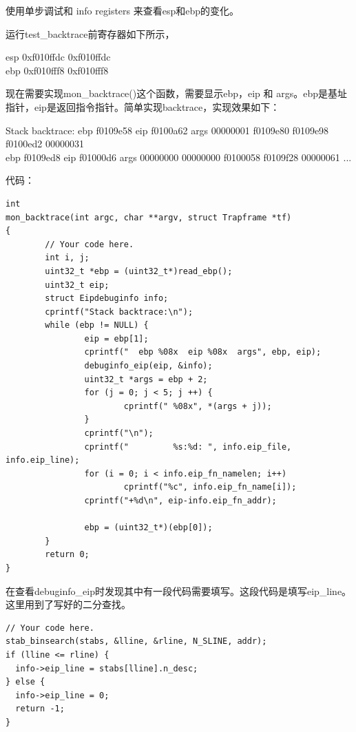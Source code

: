 \begin{ExerciseList}

使用单步调试和 info registers 来查看esp和ebp的变化。

运行test\_backtrace前寄存器如下所示，

{\noindent\small esp            0xf010ffdc    0xf010ffdc\\
ebp            0xf010fff8    0xf010fff8
}

现在需要实现mon\_backtrace()这个函数，需要显示ebp，eip 和 args。ebp是基址指针，eip是返回指令指针。简单实现backtrace，实现效果如下：

{\noindent\small Stack backtrace:
  ebp f0109e58  eip f0100a62  args 00000001 f0109e80 f0109e98 f0100ed2 00000031\\
  ebp f0109ed8  eip f01000d6  args 00000000 00000000 f0100058 f0109f28 00000061
  ...}

代码：

\begin{verbatim}
int
mon_backtrace(int argc, char **argv, struct Trapframe *tf)
{
        // Your code here.
        int i, j;
        uint32_t *ebp = (uint32_t*)read_ebp();
        uint32_t eip;
        struct Eipdebuginfo info;
        cprintf("Stack backtrace:\n");
        while (ebp != NULL) {
                eip = ebp[1];
                cprintf("  ebp %08x  eip %08x  args", ebp, eip);
                debuginfo_eip(eip, &info);
                uint32_t *args = ebp + 2;
                for (j = 0; j < 5; j ++) {
                        cprintf(" %08x", *(args + j));
                }
                cprintf("\n");
                cprintf("         %s:%d: ", info.eip_file, info.eip_line);
                for (i = 0; i < info.eip_fn_namelen; i++)
                        cprintf("%c", info.eip_fn_name[i]);
                cprintf("+%d\n", eip-info.eip_fn_addr);

                ebp = (uint32_t*)(ebp[0]);
        }
        return 0;
}
\end{verbatim}


在查看debuginfo\_eip时发现其中有一段代码需要填写。这段代码是填写eip\_line。这里用到了写好的二分查找。

\begin{verbatim}
// Your code here.
stab_binsearch(stabs, &lline, &rline, N_SLINE, addr);
if (lline <= rline) {
  info->eip_line = stabs[lline].n_desc;
} else {
  info->eip_line = 0;
  return -1;
}
\end{verbatim}


\end{ExerciseList}
